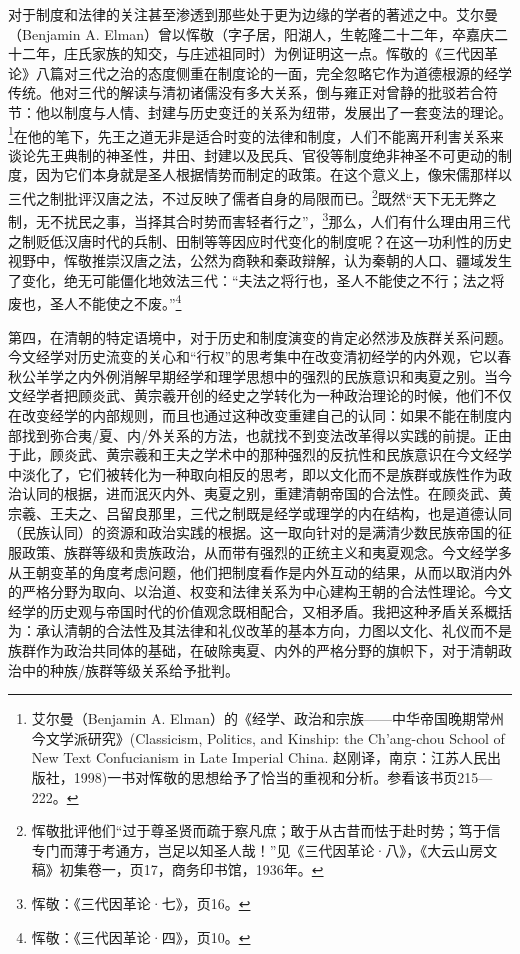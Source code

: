 \documentclass[a4paper, 12pt, openright]{ctexbook}
\begin{document}
对于制度和法律的关注甚至渗透到那些处于更为边缘的学者的著述之中。艾尔曼（Benjamin A. Elman）曾以恽敬（字子居，阳湖人，生乾隆二十二年，卒嘉庆二十二年，庄氏家族的知交，与庄述祖同时）为例证明这一点。恽敬的《三代因革论》八篇对三代之治的态度侧重在制度论的一面，完全忽略它作为道德根源的经学传统。他对三代的解读与清初诸儒没有多大关系，倒与雍正对曾静的批驳若合符节：他以制度与人情、封建与历史变迁的关系为纽带，发展出了一套变法的理论。\footnote{艾尔曼（Benjamin A. Elman）的《经学、政治和宗族——中华帝国晚期常州今文学派研究》(Classicism, Politics, and Kinship: the Ch'ang-chou School of New Text Confucianism in Late Imperial China. 赵刚译，南京：江苏人民出版社，1998)一书对恽敬的思想给予了恰当的重视和分析。参看该书页215—222。}在他的笔下，先王之道无非是适合时变的法律和制度，人们不能离开利害关系来谈论先王典制的神圣性，井田、封建以及民兵、官役等制度绝非神圣不可更动的制度，因为它们本身就是圣人根据情势而制定的政策。在这个意义上，像宋儒那样以三代之制批评汉唐之法，不过反映了儒者自身的局限而已。\footnote{恽敬批评他们“过于尊圣贤而疏于察凡庶；敢于从古昔而怯于赴时势；笃于信专门而薄于考通方，岂足以知圣人哉！”见《三代因革论·八》，《大云山房文稿》初集卷一，页17，商务印书馆，1936年。}既然“天下无无弊之制，无不扰民之事，当择其合时势而害轻者行之”，\footnote{恽敬：《三代因革论·七》，页16。}那么，人们有什么理由用三代之制贬低汉唐时代的兵制、田制等等因应时代变化的制度呢？在这一功利性的历史视野中，恽敬推崇汉唐之法，公然为商鞅和秦政辩解，认为秦朝的人口、疆域发生了变化，绝无可能僵化地效法三代：“夫法之将行也，圣人不能使之不行；法之将废也，圣人不能使之不废。”\footnote{恽敬：《三代因革论·四》，页10。}

第四，在清朝的特定语境中，对于历史和制度演变的肯定必然涉及族群关系问题。今文经学对历史流变的关心和“行权”的思考集中在改变清初经学的内外观，它以春秋公羊学之内外例消解早期经学和理学思想中的强烈的民族意识和夷夏之别。当今文经学者把顾炎武、黄宗羲开创的经史之学转化为一种政治理论的时候，他们不仅在改变经学的内部规则，而且也通过这种改变重建自己的认同：如果不能在制度内部找到弥合夷/夏、内/外关系的方法，也就找不到变法改革得以实践的前提。正由于此，顾炎武、黄宗羲和王夫之学术中的那种强烈的反抗性和民族意识在今文经学中淡化了，它们被转化为一种取向相反的思考，即以文化而不是族群或族性作为政治认同的根据，进而泯灭内外、夷夏之别，重建清朝帝国的合法性。在顾炎武、黄宗羲、王夫之、吕留良那里，三代之制既是经学或理学的内在结构，也是道德认同（民族认同）的资源和政治实践的根据。这一取向针对的是满清少数民族帝国的征服政策、族群等级和贵族政治，从而带有强烈的正统主义和夷夏观念。今文经学多从王朝变革的角度考虑问题，他们把制度看作是内外互动的结果，从而以取消内外的严格分野为取向、以治道、权变和法律关系为中心建构王朝的合法性理论。今文经学的历史观与帝国时代的价值观念既相配合，又相矛盾。我把这种矛盾关系概括为：承认清朝的合法性及其法律和礼仪改革的基本方向，力图以文化、礼仪而不是族群作为政治共同体的基础，在破除夷夏、内外的严格分野的旗帜下，对于清朝政治中的种族/族群等级关系给予批判。
\end{document}
